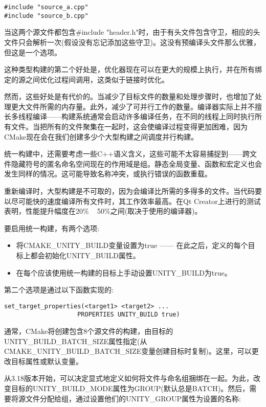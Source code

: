 \begin{lstlisting}[style=styleCXX]
#include "source_a.cpp"
#include "source_b.cpp"
\end{lstlisting}

当这两个源文件都包含\#include "header.h"时，由于有头文件包含守卫，相应的头文件只会解析一次(假设没有忘记添加这些守卫)。这没有预编译头文件那么优雅，但这是一个选项。

这种类型构建的第二个好处是，优化器现在可以在更大的规模上执行，并在所有绑定的源之间优化过程间调用，这类似于链接时优化。

然而，这些好处是有代价的。当减少了目标文件的数量和处理步骤时，也增加了处理更大文件所需的内存量。此外，减少了可并行工作的数量。编译器实际上并不擅长多线程编译——构建系统通常会启动许多编译任务，在不同的线程上同时执行所有文件。当把所有的文件聚集在一起时，这会使编译过程变得更加困难，因为CMake现在会在我们创建多少个大型构建之间调度并行构建。

统一构建中，还需要考虑一些C++语义含义，这些可能不太容易捕捉到——跨文件隐藏符号的匿名命名空间现在的作用域是组。静态全局变量、函数和宏定义也会发生同样的情况。这可能导致名称冲突，或执行错误的函数重载。

重新编译时，大型构建是不可取的，因为会编译比所需的多得多的文件。当代码要以尽可能快的速度编译所有文件时，其工作效率最高。在Qt Creator上进行的测试表明，性能提升幅度在20\% ~ 50\%之间(取决于使用的编译器)。

要启用统一构建，有两个选项:

\begin{itemize}
\item 
将CMAKE\_UNITY\_BUILD变量设置为true —— 在此之后，定义的每个目标上都会初始化UNITY\_BUILD属性。

\item 
在每个应该使用统一构建的目标上手动设置UNITY\_BUILD为true。
\end{itemize}

第二个选项是通过以下函数实现的:

\begin{lstlisting}[style=styleCMake]
set_target_properties(<target1> <target2> ...
					PROPERTIES UNITY_BUILD true)
\end{lstlisting}

通常，CMake将创建包含8个源文件的构建，由目标的UNITY\_BUILD\_BATCH\_SIZE属性指定(从CMAKE\_UNITY\_BUILD\_BATCH\_SIZE变量创建目标时复制)。这里，可以更改目标属性或默认变量。

从3.18版本开始，可以决定显式地定义如何将文件与命名组捆绑在一起。为此，改变目标的UNITY\_BUILD\_MODE属性为GROUP(默认总是BATCH)。然后，需要将源文件分配给组，通过设置他们的UNITY\_GROUP属性为设置的名称:

